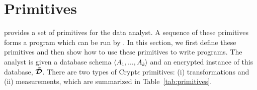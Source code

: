 
\section{\system Primitives}\label{sec:primitives}
\system provides a set of primitives for the data analyst.
A sequence of these primitives forms a program which can be run by \system.
In this section, we first define these primitives and then show how to use these primitives to write  programs.
The analyst is given a database schema $\langle A_1,\ldots,A_k \rangle$ and an encrypted instance of this database, $\boldsymbol{\tilde{\mathcal{D}}}$.
There are two types of Crypt$\epsilon$ primitives:  (i) transformations and (ii) measurements, which are summarized in Table~\ref{tab:primitives}.




